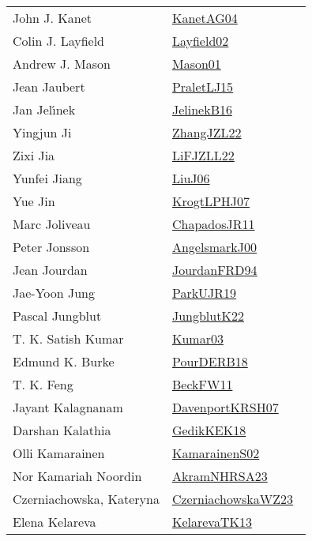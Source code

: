{\begin{longtable}{p{4cm}p{20cm}}
John J. Kanet & \href{}{KanetAG04}~\cite{KanetAG04}\\
Colin J. Layfield & \href{}{Layfield02}~\cite{Layfield02}\\
Andrew J. Mason & \href{works/Mason01.pdf}{Mason01}~\cite{Mason01}\\
Jean Jaubert & \href{works/PraletLJ15.pdf}{PraletLJ15}~\cite{PraletLJ15}\\
Jan Jel{\'{\i}}nek & \href{works/JelinekB16.pdf}{JelinekB16}~\cite{JelinekB16}\\
Yingjun Ji & \href{works/ZhangJZL22.pdf}{ZhangJZL22}~\cite{ZhangJZL22}\\
Zixi Jia & \href{works/LiFJZLL22.pdf}{LiFJZLL22}~\cite{LiFJZLL22}\\
Yunfei Jiang & \href{works/LiuJ06.pdf}{LiuJ06}~\cite{LiuJ06}\\
Yue Jin & \href{works/KrogtLPHJ07.pdf}{KrogtLPHJ07}~\cite{KrogtLPHJ07}\\
Marc Joliveau & \href{works/ChapadosJR11.pdf}{ChapadosJR11}~\cite{ChapadosJR11}\\
Peter Jonsson & \href{works/AngelsmarkJ00.pdf}{AngelsmarkJ00}~\cite{AngelsmarkJ00}\\
Jean Jourdan & \href{}{JourdanFRD94}~\cite{JourdanFRD94}\\
Jae{-}Yoon Jung & \href{works/ParkUJR19.pdf}{ParkUJR19}~\cite{ParkUJR19}\\
Pascal Jungblut & \href{works/JungblutK22.pdf}{JungblutK22}~\cite{JungblutK22}\\
T. K. Satish Kumar & \href{works/Kumar03.pdf}{Kumar03}~\cite{Kumar03}\\
Edmund K. Burke & \href{works/PourDERB18.pdf}{PourDERB18}~\cite{PourDERB18}\\
T. K. Feng & \href{works/BeckFW11.pdf}{BeckFW11}~\cite{BeckFW11}\\
Jayant Kalagnanam & \href{works/DavenportKRSH07.pdf}{DavenportKRSH07}~\cite{DavenportKRSH07}\\
Darshan Kalathia & \href{works/GedikKEK18.pdf}{GedikKEK18}~\cite{GedikKEK18}\\
Olli Kamarainen & \href{works/KamarainenS02.pdf}{KamarainenS02}~\cite{KamarainenS02}\\
Nor Kamariah Noordin & \href{works/AkramNHRSA23.pdf}{AkramNHRSA23}~\cite{AkramNHRSA23}\\
Czerniachowska, Kateryna & \href{works/CzerniachowskaWZ23.pdf}{CzerniachowskaWZ23}~\cite{CzerniachowskaWZ23}\\
Elena Kelareva & \href{works/KelarevaTK13.pdf}{KelarevaTK13}~\cite{KelarevaTK13}\\

\end{longtable}}
